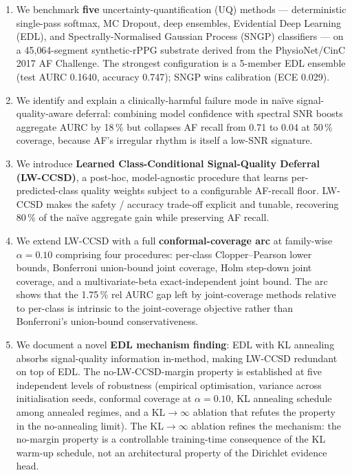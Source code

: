 \documentclass[journal]{IEEEtran}
\begin{document}
\begin{enumerate}
\item We benchmark \textbf{five} uncertainty-quantification (UQ) methods --- deterministic single-pass softmax, MC Dropout, deep ensembles, Evidential Deep Learning (EDL), and Spectrally-Normalised Gaussian Process (SNGP) classifiers --- on a 45{,}064-segment synthetic-rPPG substrate derived from the PhysioNet/CinC 2017 AF Challenge. The strongest configuration is a 5-member EDL ensemble (test AURC 0.1640, accuracy 0.747); SNGP wins calibration (ECE 0.029).

\item We identify and explain a clinically-harmful failure mode in na\"{i}ve signal-quality-aware deferral: combining model confidence with spectral SNR boosts aggregate AURC by 18\,\% but collapses AF recall from 0.71 to 0.04 at 50\,\% coverage, because AF's irregular rhythm is itself a low-SNR signature.

\item We introduce \textbf{Learned Class-Conditional Signal-Quality Deferral (LW-CCSD)}, a post-hoc, model-agnostic procedure that learns per-predicted-class quality weights subject to a configurable AF-recall floor. LW-CCSD makes the safety / accuracy trade-off explicit and tunable, recovering 80\,\% of the na\"{i}ve aggregate gain while preserving AF recall.

\item We extend LW-CCSD with a full \textbf{conformal-coverage arc} at family-wise $\alpha=0.10$ comprising four procedures: per-class Clopper--Pearson lower bounds, Bonferroni union-bound joint coverage, Holm step-down joint coverage, and a multivariate-beta exact-independent joint bound. The arc shows that the 1.75\,\% rel AURC gap left by joint-coverage methods relative to per-class is intrinsic to the joint-coverage objective rather than Bonferroni's union-bound conservativeness.

\item We document a novel \textbf{EDL mechanism finding}: EDL with KL annealing absorbs signal-quality information in-method, making LW-CCSD redundant on top of EDL. The no-LW-CCSD-margin property is established at five independent levels of robustness (empirical optimisation, variance across initialisation seeds, conformal coverage at $\alpha=0.10$, KL annealing schedule among annealed regimes, and a KL$\to\infty$ ablation that refutes the property in the no-annealing limit). The KL$\to\infty$ ablation refines the mechanism: the no-margin property is a controllable training-time consequence of the KL warm-up schedule, not an architectural property of the Dirichlet evidence head.
\end{enumerate}
\end{document}
